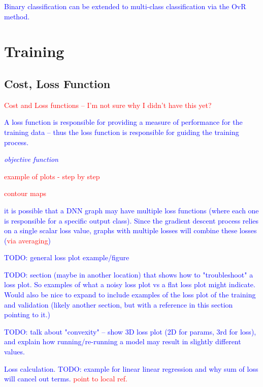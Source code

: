 \textcolor{blue}{Binary classification can be extended to multi-class classification via the OvR method.}


\section{Training}

\subsection{Cost, Loss Function}

\textcolor{red}{Cost and Loss functions -- I'm not sure why I didn't have this yet?}

\textcolor{blue}{A loss function is responsible for providing a measure of performance for the training data -- thus the loss function is responsible for guiding the training process.}

\textcolor{blue}{\textit{objective function}}

\textcolor{red}{example of plots - step by step}

\textcolor{red}{contour maps}

\textcolor{blue}{it is possible that a DNN graph may have multiple loss functions (where each one is responsible for a specific output class). Since the gradient descent process relies on a single scalar loss value, graphs with multiple losses will combine these losses (\textcolor{red}{via averaging})}

\textcolor{blue}{TODO: general loss plot example/figure}

\textcolor{blue}{TODO: section (maybe in another location) that shows how to "troubleshoot" a loss plot. So examples of what a noisy loss plot vs a flat loss plot might indicate. Would also be nice to expand to include examples of the loss plot of the training and validation (likely another section, but with a reference in this section pointing to it.)}

\textcolor{blue}{TODO: talk about "convexity" -- show 3D loss plot (2D for params, 3rd for loss), and explain how running/re-running a model may result in slightly different values.}

\textcolor{blue}{Loss calculation. TODO: example for linear linear regression and why sum of loss will cancel out terms. \textcolor{red}{point to local ref.}}

